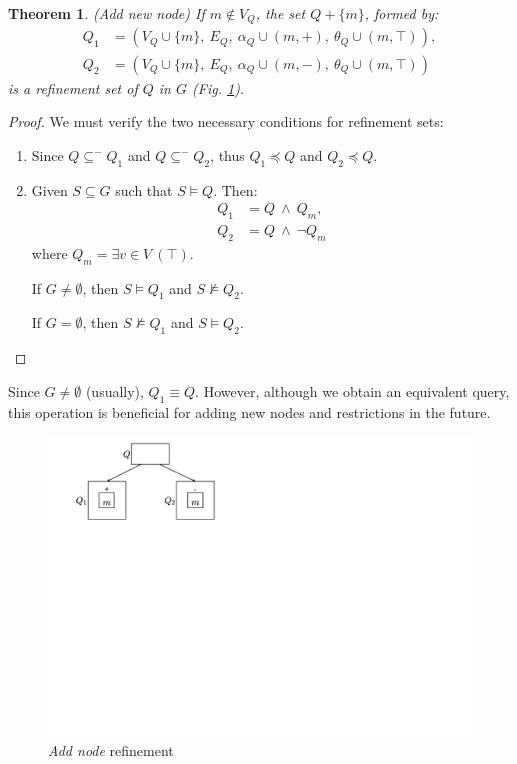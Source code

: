 \documentclass[mathematics,article,submit,pdftex,moreauthors]{Definitions/mdpi}
\newtheorem{theorem}{Theorem}
\begin{document}
\begin{theorem}{(Add new node)}
    If $m\notin V_Q$, the set $Q+\{m\}$, formed by:
        \begin{align*}
        Q_1 &= (V_Q\cup\{m\},\ E_Q,\ \alpha_Q\cup(m,+),\ \theta_Q\cup(m,\top)) , \\ 
         Q_2 &= (V_Q\cup\{m\},\ E_Q,\ \alpha_Q\cup(m,-),\ \theta_Q\cup(m,\top))
        \end{align*}
    is a refinement set of $Q$ in $G$ (Fig. \ref{ref1}).
\end{theorem}
\begin{proof}{}
	We must verify the two necessary conditions for refinement sets:
	\begin{enumerate}
		\item Since $Q\subseteq^- Q_1$ and $Q\subseteq^- Q_2$, thus $Q_1\preceq Q$ and $Q_2\preceq Q$.
		\item Given $S\subseteq G$ such that $S\vDash Q$. Then:
		\begin{align*}
		Q_1&= Q\ \wedge\ Q_m ,\\
		Q_2&= Q\ \wedge\ \neg Q_m 
		\end{align*}
		where $Q_m=\exists v\in V\ (\top)$.
		
		If $G\neq \emptyset$, then $S\vDash Q_1$ and $S\nvDash Q_2$.
		
		If $G= \emptyset$, then $S\nvDash Q_1$ and $S\vDash Q_2$.
	\end{enumerate}
\end{proof}

Since $ G \neq \emptyset $ (usually), $ Q_1 \equiv Q $. However, although we obtain an equivalent query, this operation is beneficial for adding new nodes and restrictions in the future.

\begin{figure}[h]
    \begin{center}
        \includegraphics[scale=0.3]{png/REF1.pdf}
    \end{center}
    \caption{%
        \textit{Add node} refinement
    }%
    \label{ref1}
\end{figure}
\end{document}
